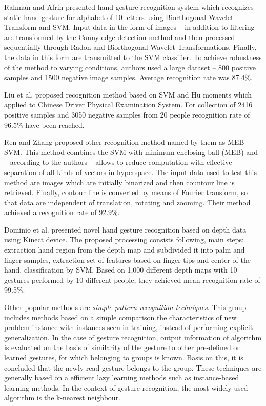 Rahman and Afrin \cite{RahmanHand} presented hand gesture recognition system which recognizes static hand gesture for alphabet of 10 letters using Biorthogonal Wavelet Transform and SVM. Input data in the form of images -- in addition to filtering -- are transformed by the Canny edge detection method and then processed sequentially through Radon and Biorthogonal Wavelet Transformations. Finally, the data in this form are transmitted to the SVM classifier. To achieve robustness of the method to varying conditions, authors used a large dataset -- 800 positive samples and 1500 negative image samples. Average recognition rate was 87.4\%.

Liu et al. \cite{LiuStatic} proposed recognition method based on SVM and Hu moments which applied to Chinese Driver Physical Examination System. For collection of 2416 positive samples and 3050 negative samples from 20 people recognition rate of 96.5\% have been reached.

Ren and Zhang \cite{RenMEBSVM} proposed other recognition method named by them as MEB-SVM. This method combines the SVM with minimum enclosing ball (MEB) and -- according to the authors -- allows to reduce computation with effective separation of all kinds of vectors in hyperspace. The input data used to test this method are images which are initially binarized and then countour line is retrieved. Finally, contour line is converted by means of Fourier transform, so that data are independent of translation, rotating and zooming. Their method achieved a recognition rate of 92.9\%.


Dominio et al. \cite{Dominio:2013:HGR:2510650.2510651} presented novel hand gesture recognition based on depth data using Kinect device. The proposed processing consists following, main steps: extraction hand region from the depth map and subdivided it into palm and finger samples, extraction set of features based on finger tips and center of the hand, classification by SVM. Based on 1,000 different depth maps with 10 gestures performed by 10 different people, they achieved mean recognition rate of 99.5\%.

Other popular methods are \emph{simple pattern recognition techniques}. This group includes methods based on a simple comparison the characteristics of new problem instance with instances seen in training, instead of performing explicit generalization. In the case of gesture recognition, output information of algorithm is evaluated on the basis of similarity of the gesture to other pre-defined or learned gestures, for which belonging to groups is known. Basis on this, it is concluded that the newly read gesture belongs to the group. These techniques are generally based on a efficient lazy learning methods such as instance-based learning methods.  In the context of gesture recognition, the most widely used algorithm is the k-nearest neighbour.
